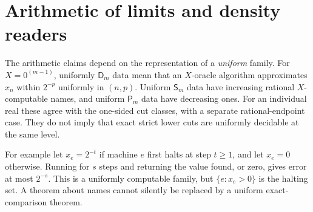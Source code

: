 \section{Arithmetic of limits and density readers}\label{sec:arithmetic}
The arithmetic claims depend on the representation of a \emph{uniform}
family. For $X=0^{(m-1)}$, uniformly $\mathsf D_m$ data mean that an
$X$-oracle algorithm approximates $x_n$ within $2^{-p}$ uniformly in
$(n,p)$. Uniform $\mathsf S_m$ data have increasing rational
$X$-computable names, and uniform $\mathsf P_m$ data have decreasing
ones. For an individual real these agree with the one-sided cut classes,
with a separate rational-endpoint case. They do not imply that exact
strict lower cuts are uniformly decidable at the same level.

For example let $x_e=2^{-t}$ if machine $e$ first halts at step $t\geq1$,
and let $x_e=0$ otherwise. Running for $s$ steps and returning the value
found, or zero, gives error at most $2^{-s}$. This is a uniformly
computable family, but $\{e:x_e>0\}$ is the halting set. A theorem about
names cannot silently be replaced by a uniform exact-comparison theorem.

